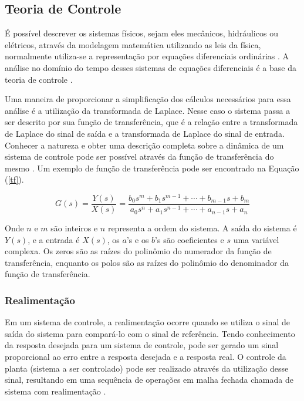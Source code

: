\documentclass[journal,brazil,english]{IEEEtran}
\begin{document}
\subsection{Teoria de Controle}
É possível descrever os sistemas físicos, sejam eles mecânicos, hidráulicos ou elétricos, através da modelagem matemática utilizando as leis da física, normalmente utiliza-se a representação por equações diferenciais ordinárias \cite{dorf}. A análise no domínio do tempo desses sistemas de equações diferenciais é a base da teoria de controle \cite{ogata}.

Uma maneira de proporcionar a simplificação dos cálculos necessários para essa análise é a utilização da transformada de Laplace. Nesse caso o sistema passa a ser descrito por sua função de transferência, que é a relação entre a transformada de Laplace do sinal de saída e a transformada de Laplace do sinal de entrada. Conhecer a natureza e obter uma descrição completa sobre a dinâmica de um sistema de controle pode ser possível através da função de transferência do mesmo \cite{ogata}. Um exemplo de função de transferência pode ser encontrado na Equação (\ref{tf}).

\begin{equation}\label{tf}
G(s) = \frac{Y(s)}{X(s)} = \frac{b_{0}s^m + b_{1}s^{m-1} + \cdots + b_{m-1}s + b_m}{a_{0}s^n + a_{1}s^{n-1} + \cdots + a_{n-1}s + a_n}
\end{equation}

Onde $n$ e $m$ são inteiros e $n$ representa a ordem do sistema. A saída do sistema é $Y(s)$, e a entrada é $X(s)$, os $a$'s e os $b$'s são coeficientes e $s$ uma variável complexa.  Os zeros são as raízes do polinômio do numerador da função de transferência, enquanto os polos são as raízes do polinômio do denominador da função de transferência.

\subsubsection{Realimentação}
Em um sistema de controle, a realimentação ocorre quando se utiliza o sinal de saída do sistema para compará-lo com o sinal de referência. Tendo conhecimento da resposta desejada para um sistema de controle, pode ser gerado um sinal proporcional ao erro entre a resposta desejada e a resposta real. O controle da planta (sistema a ser controlado) pode ser realizado através da utilização desse sinal, resultando em uma sequência de operações em malha fechada chamada de sistema com realimentação \cite{dorf}.
\end{document}
